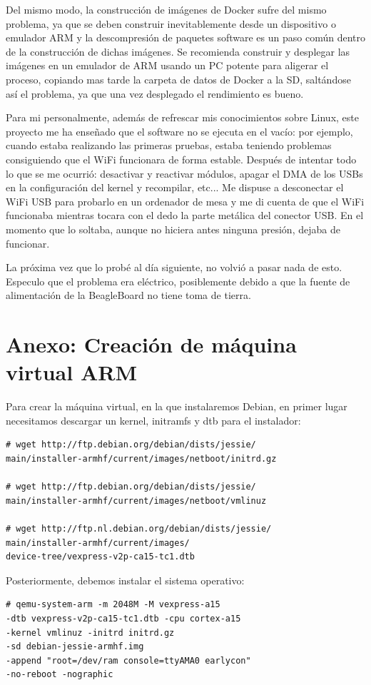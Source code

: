 \documentclass{tfg}
\begin{document}
Del mismo modo, la construcción de imágenes de Docker sufre del mismo problema, ya que se deben construir inevitablemente desde un dispositivo o emulador ARM y la descompresión de paquetes software es un paso común dentro de la construcción de dichas imágenes. Se recomienda construir y desplegar las imágenes en un emulador de ARM usando un PC potente para aligerar el proceso, copiando mas tarde la carpeta de datos de Docker a la SD, saltándose así el problema, ya que una vez desplegado el rendimiento es bueno.

Para mi personalmente, además de refrescar mis conocimientos sobre Linux, este proyecto me ha enseñado que el software no se ejecuta en el vacío: por ejemplo, cuando estaba realizando las primeras pruebas, estaba teniendo problemas consiguiendo que el WiFi funcionara de forma estable. Después de intentar todo lo que se me ocurrió: desactivar y reactivar módulos, apagar el DMA de los USBs en la configuración del kernel y recompilar, etc... Me dispuse a desconectar el WiFi USB para probarlo en un ordenador de mesa y me di cuenta de que el WiFi funcionaba mientras tocara con el dedo la parte metálica del conector USB. En el momento que lo soltaba, aunque no hiciera antes ninguna presión, dejaba de funcionar.

La próxima vez que lo probé al día siguiente, no volvió a pasar nada de esto. Especulo que el problema era eléctrico, posiblemente debido a que la fuente de alimentación de la BeagleBoard no tiene toma de tierra.

\chapter{Anexo: Creación de máquina virtual ARM}
Para crear la máquina virtual, en la que instalaremos Debian, en primer lugar necesitamos descargar un kernel, initramfs y dtb para el instalador:
\begin{lstlisting}[caption=Descarga del netinstaller]
# wget http://ftp.debian.org/debian/dists/jessie/
main/installer-armhf/current/images/netboot/initrd.gz

# wget http://ftp.debian.org/debian/dists/jessie/
main/installer-armhf/current/images/netboot/vmlinuz

# wget http://ftp.nl.debian.org/debian/dists/jessie/
main/installer-armhf/current/images/
device-tree/vexpress-v2p-ca15-tc1.dtb
\end{lstlisting}

Posteriormente, debemos instalar el sistema operativo:
\begin{lstlisting}[caption=Instalacion de Debian ARM]
# qemu-system-arm -m 2048M -M vexpress-a15
-dtb vexpress-v2p-ca15-tc1.dtb -cpu cortex-a15
-kernel vmlinuz -initrd initrd.gz
-sd debian-jessie-armhf.img
-append "root=/dev/ram console=ttyAMA0 earlycon"
-no-reboot -nographic
\end{lstlisting}
\end{document}
